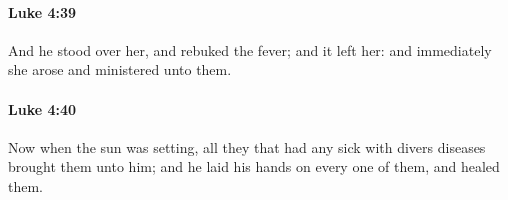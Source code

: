 		\paragraph{Luke 4:39} %
			\label{LUKE-4-39}

			And he stood over her, and rebuked the fever; and it left her: and immediately she arose and ministered unto them.

			\begin{framed}
			\scriptsize
				\begin{compactdesc}
					\item[SBLG] 
				\end{compactdesc}
			\end{framed}

		\paragraph{Luke 4:40} %
			\label{LUKE-4-40}

			Now when the sun was setting, all they that had any sick with divers diseases brought them unto him; and he laid his hands on every one of them, and healed them.

